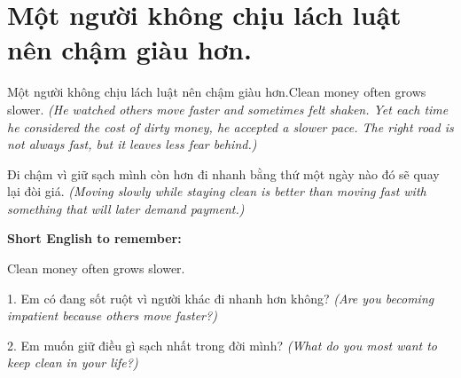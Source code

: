 \section{Một người không chịu lách luật nên chậm giàu hơn.}
\begin{truyen}{Một người không chịu lách luật nên chậm giàu hơn.}{Clean money often grows slower.}
\textit{(He watched others move faster and sometimes felt shaken. Yet each time he considered the cost of dirty money, he accepted a slower pace. The right road is not always fast, but it leaves less fear behind.)}
\end{truyen}
\begin{baihoc}
Đi chậm vì giữ sạch mình còn hơn đi nhanh bằng thứ một ngày nào đó sẽ quay lại đòi giá.
\textit{(Moving slowly while staying clean is better than moving fast with something that will later demand payment.)}
\end{baihoc}
\begin{ghinhoanh}\textbf{Short English to remember:}

Clean money often grows slower.
\end{ghinhoanh}
\begin{tuhocnhanh}
1. Em có đang sốt ruột vì người khác đi nhanh hơn không? \textit{(Are you becoming impatient because others move faster?)}

2. Em muốn giữ điều gì sạch nhất trong đời mình? \textit{(What do you most want to keep clean in your life?)}
\end{tuhocnhanh}
\ngancach

